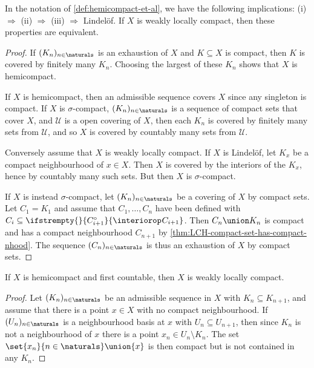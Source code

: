 \documentclass[article, a4paper, 11pt, oneside]{memoir}
\numberwithin{equation}{chapter}
\newcommand{\calU}{\mathcal{U}}
\renewcommand\interior[2][]{%
    \ifstrempty{#1}{%
        #2^{\circ}
    }{%
        \interiorop_{#1}#2
    }%
}
\begin{document}
\begin{proposition}
    In the notation of \cref{def:hemicompact-et-al}, we have the following implications: (i) $\Rightarrow$ (ii) $\Rightarrow$ (iii) $\Rightarrow$ Lindelöf. If $X$ is weakly locally compact, then these properties are equivalent.
\end{proposition}

\begin{proof}
    If $(K_n)_{n \in \naturals}$ is an exhaustion of $X$ and $K \subseteq X$ is compact, then $K$ is covered by finitely many $K_n$. Choosing the largest of these $K_n$ shows that $X$ is hemicompact.

    If $X$ is hemicompact, then an admissible sequence covers $X$ since any singleton is compact. If $X$ is $\sigma$-compact, $(K_n)_{n \in \naturals}$ is a sequence of compact sets that cover $X$, and $\calU$ is a open covering of $X$, then each $K_n$ is covered by finitely many sets from $\calU$, and so $X$ is covered by countably many sets from $\calU$.

    Conversely assume that $X$ is weakly locally compact. If $X$ is Lindelöf, let $K_x$ be a compact neighbourhood of $x \in X$. Then $X$ is covered by the interiors of the $K_x$, hence by countably many such sets. But then $X$ is $\sigma$-compact.

    If $X$ is instead $\sigma$-compact, let $(K_n)_{n \in \naturals}$ be a covering of $X$ by compact sets. Let $C_1 = K_1$ and assume that $C_1, \ldots, C_n$ have been defined with $C_i \subseteq \interior{C_{i+1}}$. Then $C_n \union K_n$ is compact and has a compact neighbourhood $C_{n+1}$ by \cref{thm:LCH-compact-set-has-compact-nhood}. The sequence $(C_n)_{n \in \naturals}$ is thus an exhaustion of $X$ by compact sets.
\end{proof}


\begin{proposition}
    If $X$ is hemicompact and first countable, then $X$ is weakly locally compact.
\end{proposition}

\begin{proof}
    Let $(K_n)_{n \in \naturals}$ be an admissible sequence in $X$ with $K_n \subseteq K_{n+1}$, and assume that there is a point $x \in X$ with no compact neighbourhood. If $(U_n)_{n \in \naturals}$ is a neighbourhood basis at $x$ with $U_n \subseteq U_{n+1}$, then since $K_n$ is not a neighbourhood of $x$ there is a point $x_n \in U_n \setminus K_n$. The set $\set{x_n}{n \in \naturals} \union \{x\}$ is then compact but is not contained in any $K_n$.
\end{proof}
\end{document}
